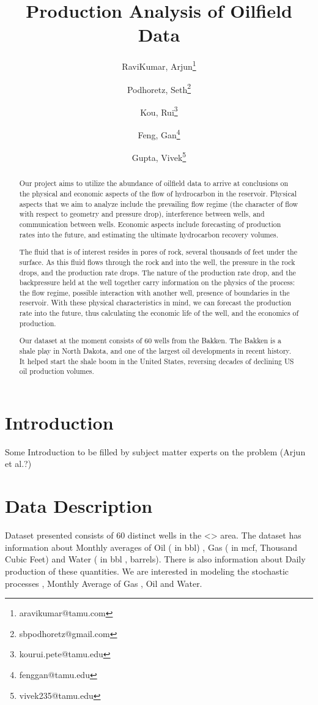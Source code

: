 \documentclass[a4paper]{article}
\title{Production Analysis of Oilfield Data}
\author{RaviKumar, Arjun\thanks{aravikumar@tamu.com}}
\author{Podhoretz, Seth\thanks{sbpodhoretz@gmail.com}}
\author{Kou, Rui\thanks{kourui.pete@tamu.edu}}
\author{Feng, Gan\thanks{fenggan@tamu.edu}}
\author{Gupta, Vivek\thanks{vivek235@tamu.edu}}
\affil{Department of Statistics, Texas A \& M University}
\begin{document}
	\maketitle
	

	
\begin{abstract}
	Our project aims to utilize the abundance of oilfield data to arrive at conclusions on the physical and
	economic aspects of the flow of hydrocarbon in the reservoir. Physical aspects that we aim to analyze include
	the prevailing flow regime (the character of flow with respect to geometry and pressure drop), interference
	between wells, and communication between wells. Economic aspects include forecasting of production rates
	into the future, and estimating the ultimate hydrocarbon recovery volumes. 
	
	
	The fluid that is of interest resides in pores of rock, several thousands of feet under the surface. As this
	fluid flows through the rock and into the well, the pressure in the rock drops, and the production rate drops.
	The nature of the production rate drop, and the backpressure held at the well together carry information on
	the physics of the process: the flow regime, possible interaction with another well, presence of boundaries
	in the reservoir. With these physical characteristics in mind, we can forecast the production rate into the
	future, thus calculating the economic life of the well, and the economics of production.
	
	
	Our dataset at the moment consists of 60 wells from the Bakken. The Bakken is a shale play in North
	Dakota, and one of the largest oil developments in recent history. It helped start the shale boom in the
	United States, reversing decades of declining US oil production volumes. 
\end{abstract}

\newpage
\section{Introduction}
 Some Introduction to be filled by subject matter experts on the problem (Arjun et al.?)
 
\section{Data Description}
 Dataset presented consists of 60 distinct wells in the <> area. The dataset has information about Monthly averages of Oil ( in bbl) , Gas ( in mcf, Thousand Cubic Feet) and Water ( in bbl , barrels). There is also information about  Daily production of these quantities. We are interested in modeling the stochastic processes , Monthly Average of Gas , Oil and Water.
 
\end{document}
